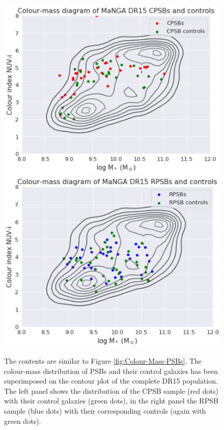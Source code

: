 \begin{figure}
    \centering
    \includegraphics[width=\columnwidth]{images/CMDs/CMD-CPSBs+CONTROLS-TIX.png}
    \includegraphics[width=\columnwidth]{images/CMDs/CMD-RPSBs+CONTROLS-TIX.png}
    \caption[Colour-mass distribution of PSBs and controls]{The contents are similar to Figure \ref{fig:Colour-Mass-PSBs}. The colour-mass distribution of PSBs and their control galaxies has been superimposed on the contour plot of the complete DR15 population. The left panel shows the distribution of the CPSB sample (red dots) with their control galaxies (green dots), in the right panel the RPSB sample (blue dots) with their corresponding controls (again with green dots).}
    \label{fig:Colour-Mass-PSBs-controls}
\end{figure}

